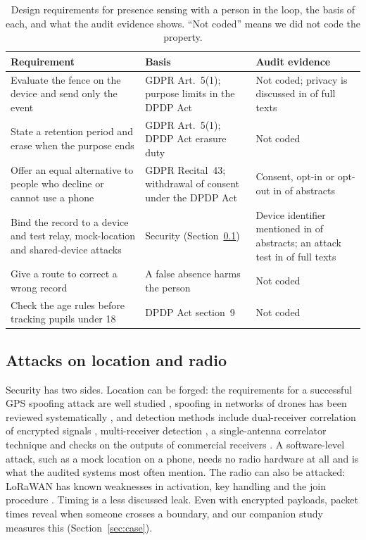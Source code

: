 \documentclass[preprint,12pt]{elsarticle}
\begin{document}
\begin{table}[tbp]\centering\footnotesize
\caption{Design requirements for presence sensing with a person in the loop, the basis of each, and what the audit evidence shows. ``Not coded'' means we did not code the property.}\label{tab:human}
\begin{tabular}{@{}L{4.4cm}L{3.5cm}L{4.4cm}@{}}\toprule
Requirement & Basis & Audit evidence \\ \midrule
Evaluate the fence on the device and send only the event & GDPR Art.~5(1); purpose limits in the DPDP Act & Not coded; privacy is discussed in \ftQsix{} of \ftN{} full texts \\
State a retention period and erase when the purpose ends & GDPR Art.~5(1); DPDP Act erasure duty & Not coded \\
Offer an equal alternative to people who decline or cannot use a phone & GDPR Recital~43; withdrawal of consent under the DPDP Act & Consent, opt-in or opt-out in \hfConsent{} of \hfN{} abstracts \\
Bind the record to a device and test relay, mock-location and shared-device attacks & Security (Section~\ref{sec:sec}) & Device identifier mentioned in \hfDevBind{} of \hfN{} abstracts; an attack test in \ftQthree{} of \ftN{} full texts \\
Give a route to correct a wrong record & A false absence harms the person & Not coded \\
Check the age rules before tracking pupils under 18 & DPDP Act section~9 & Not coded \\ \bottomrule
\end{tabular}
\end{table}

\subsection{Attacks on location and radio}\label{sec:sec}

Security has two sides. Location can be forged: the requirements for a successful GPS spoofing attack are well studied \cite{tippenhauer2011spoofing,psiaki2016gnss}, spoofing in networks of drones has been reviewed systematically \cite{@128}, and detection methods include dual-receiver correlation of encrypted signals \cite{@27}, multi-receiver detection \cite{@195}, a single-antenna correlator technique \cite{@114} and checks on the outputs of commercial receivers \cite{@223}. A software-level attack, such as a mock location on a phone, needs no radio hardware at all and is what the audited systems most often mention. The radio can also be attacked: LoRaWAN has known weaknesses in activation, key handling and the join procedure \cite{@54,@17,@62,@82,@237,@313}. Timing is a less discussed leak. Even with encrypted payloads, packet times reveal when someone crosses a boundary, and our companion study measures this (Section~\ref{sec:case}).
\end{document}
